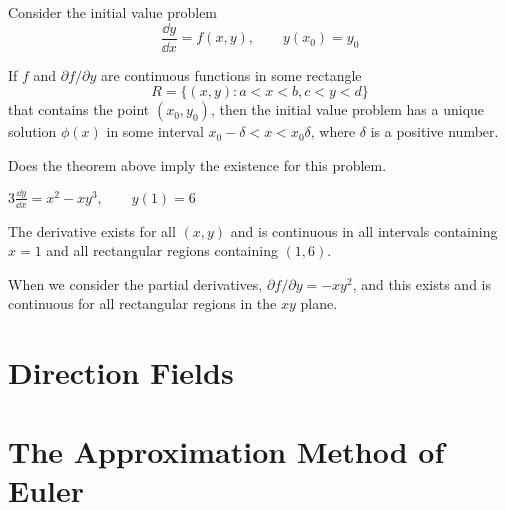 \documentclass[../diffeq.tex]{subfiles}
\begin{document}
\begin{theorem}
    Consider the initial value problem 
    \[ \frac{\dd y}{\dd x}=f(x,y), \qquad y(x_0)=y_0 \]

    If $f$ and $\partial f/\partial y$ are continuous functions in some rectangle 
    \[ R = \{(x,y): a<x<b, c<y<d\} \]
    that contains the point $(x_0,y_0)$, then the initial value problem has a unique solution $\phi(x)$ in some interval $x_0-\delta<x<x_0\delta$, where $\delta$ is a positive number.
\end{theorem}

\begin{example}
    Does the theorem above imply the existence for this problem.

    $3\frac{\dd y}{\dd x}=x^2-xy^3, \qquad y(1)=6$

    The derivative exists for all $(x,y)$ and is continuous in all intervals containing $x=1$ and all rectangular regions containing $(1,6)$.

    When we consider the partial derivatives, $\partial f/\partial y = -xy^2$, and this exists and is continuous for all rectangular regions in the $xy$ plane.
\end{example}

\section{Direction Fields}
\section{The Approximation Method of Euler}
\end{document}

